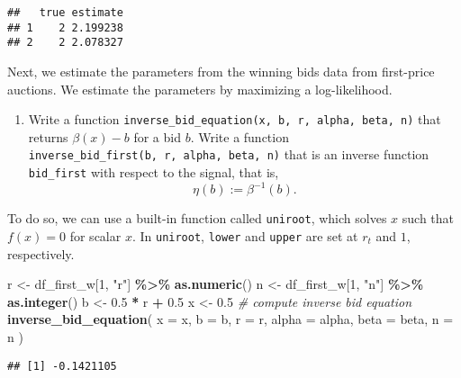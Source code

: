 \documentclass[
]{book}
\newenvironment{Shaded}{\begin{snugshade}}{\end{snugshade}}
\newcommand{\AttributeTok}[1]{\textcolor[rgb]{0.13,0.29,0.53}{#1}}
\newcommand{\CommentTok}[1]{\textcolor[rgb]{0.56,0.35,0.01}{\textit{#1}}}
\newcommand{\DecValTok}[1]{\textcolor[rgb]{0.00,0.00,0.81}{#1}}
\newcommand{\FloatTok}[1]{\textcolor[rgb]{0.00,0.00,0.81}{#1}}
\newcommand{\FunctionTok}[1]{\textcolor[rgb]{0.13,0.29,0.53}{\textbf{#1}}}
\newcommand{\NormalTok}[1]{#1}
\newcommand{\OtherTok}[1]{\textcolor[rgb]{0.56,0.35,0.01}{#1}}
\newcommand{\SpecialCharTok}[1]{\textcolor[rgb]{0.81,0.36,0.00}{\textbf{#1}}}
\newcommand{\StringTok}[1]{\textcolor[rgb]{0.31,0.60,0.02}{#1}}
\providecommand{\tightlist}{%
  \setlength{\itemsep}{0pt}\setlength{\parskip}{0pt}}
\begin{document}
\begin{verbatim}
##   true estimate
## 1    2 2.199238
## 2    2 2.078327
\end{verbatim}

Next, we estimate the parameters from the winning bids data from first-price auctions. We estimate the parameters by maximizing a log-likelihood.

\begin{enumerate}
\def\labelenumi{\arabic{enumi}.}
\setcounter{enumi}{4}
\tightlist
\item
  Write a function \texttt{inverse\_bid\_equation(x,\ b,\ r,\ alpha,\ beta,\ n)} that returns \(\beta(x) - b\) for a bid \(b\). Write a function \texttt{inverse\_bid\_first(b,\ r,\ alpha,\ beta,\ n)} that is an inverse function \texttt{bid\_first} with respect to the signal, that is,
  \[
  \eta(b) := \beta^{-1}(b).
  \]
\end{enumerate}

To do so, we can use a built-in function called \texttt{uniroot}, which solves \(x\) such that \(f(x) = 0\) for scalar \(x\). In \texttt{uniroot}, \texttt{lower} and \texttt{upper} are set at \(r_t\) and \(1\), respectively.

\begin{Shaded}
\begin{Highlighting}[]
\NormalTok{r }\OtherTok{\textless{}{-}}\NormalTok{ df\_first\_w[}\DecValTok{1}\NormalTok{, }\StringTok{"r"}\NormalTok{] }\SpecialCharTok{\%\textgreater{}\%}
  \FunctionTok{as.numeric}\NormalTok{()}
\NormalTok{n }\OtherTok{\textless{}{-}}\NormalTok{ df\_first\_w[}\DecValTok{1}\NormalTok{, }\StringTok{"n"}\NormalTok{] }\SpecialCharTok{\%\textgreater{}\%}
  \FunctionTok{as.integer}\NormalTok{()}
\NormalTok{b }\OtherTok{\textless{}{-}} \FloatTok{0.5} \SpecialCharTok{*}\NormalTok{ r }\SpecialCharTok{+} \FloatTok{0.5} 
\NormalTok{x }\OtherTok{\textless{}{-}} \FloatTok{0.5}
\CommentTok{\# compute inverse bid equation}
\FunctionTok{inverse\_bid\_equation}\NormalTok{(}
  \AttributeTok{x =}\NormalTok{ x,}
  \AttributeTok{b =}\NormalTok{ b,}
  \AttributeTok{r =}\NormalTok{ r,}
  \AttributeTok{alpha =}\NormalTok{ alpha, }
  \AttributeTok{beta =}\NormalTok{ beta,}
  \AttributeTok{n =}\NormalTok{ n}
\NormalTok{  )}
\end{Highlighting}
\end{Shaded}

\begin{verbatim}
## [1] -0.1421105
\end{verbatim}
\end{document}
